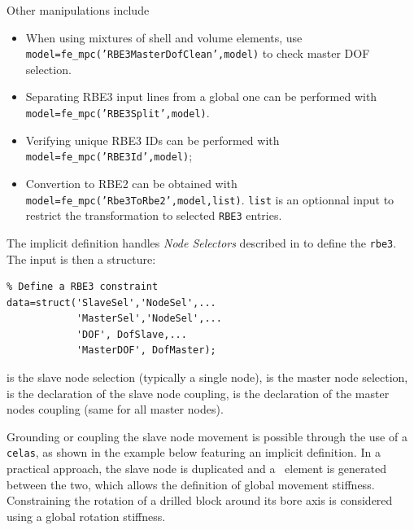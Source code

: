 Other manipulations include
\begin{itemize}
\item When using mixtures of shell and volume elements, use {\tt model=fe\_mpc('RBE3MasterDofClean',model)} to check master DOF selection.
\item Separating RBE3 input lines from a global one can be performed with {\tt model=fe\_mpc('RBE3Split',model)}.
\item Verifying unique RBE3 IDs can be performed with {\tt model=fe\_mpc('RBE3Id',model)};
\item Convertion to RBE2 can be obtained with {\tt model=fe\_mpc('Rbe3ToRbe2',model,list)}. {\tt list} is an optionnal input to restrict the transformation to selected {\tt RBE3} entries.
\end{itemize}


The implicit definition handles {\it Node Selectors} described in  to define the {\tt rbe3}. The input is then a structure:

\begin{verbatim}
% Define a RBE3 constraint
data=struct('SlaveSel','NodeSel',...
            'MasterSel','NodeSel',...
            'DOF', DofSlave,...
            'MasterDOF', DofMaster);
\end{verbatim}

 is the slave node selection (typically a single node),  is the master node selection,  is the declaration of the slave node coupling,  is the declaration of the master nodes coupling (same for all master nodes).

Grounding or coupling the slave node movement is possible through the use of a {\tt celas}, as shown in the example below featuring an implicit  definition. In a practical approach, the slave node is duplicated and a \celas\ element is generated between the two, which allows the definition of global movement stiffness.  Constraining the rotation of a drilled block around its bore axis is considered using a global rotation stiffness.

